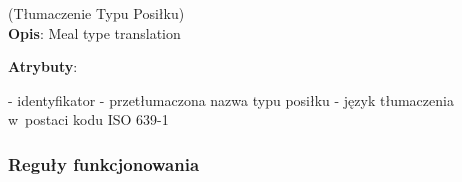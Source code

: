 \begin{enumerate}[label={\textbf{KAT/2/\protect\twodigits{\theenumi}}}, wide, labelwidth=!, labelindent=0pt, labelsep=0pt, series=reqs]
    \label{kat:MealTypeTranslation} (Tłumaczenie Typu Posiłku)\\
    \indent\textbf{Opis}: Meal type translation
    \par
    \textbf{Atrybuty}:
    \begin{itemize}[series=atr, wide, align=left, leftmargin=190pt]
        \label{kat:MealTypeTranslation:id}- identyfikator
        \label{kat:MealTypeTranslation:translation}- przetłumaczona nazwa typu posiłku
        \label{kat:MealTypeTranslation:language}- język tłumaczenia w~postaci kodu ISO 639-1
    \end{itemize}

\end{enumerate}

\subsubsection{Reguły funkcjonowania}\label{subsubsec:database:recipes:functionalRules}

